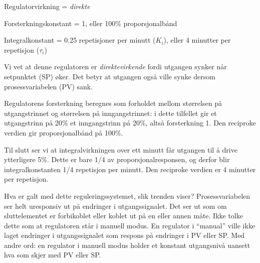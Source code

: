 
Regulatorvirkning = {\it direkte}

\vskip 10pt

Forsterkningskonstant = 1, eller 100\% proporsjonalbånd

\vskip 10pt

Integralkonstant = 0.25 repetisjoner per minutt ($K_i$), eller 4 minutter per repetisjon ($\tau_i$)







Vi vet at denne regulatoren er {\it direktevirkende} fordi utgangen synker når setpunktet (SP) øker. Det betyr at utgangen også ville synke dersom prosessvariabelen (PV) sank.

Regulatorens forsterkning beregnes som forholdet mellom størrelsen på utgangstrinnet og størrelsen på inngangstrinnet: i dette tilfellet gir et utgangstrinn på 20\% et inngangstrinn på 20\%, altså forsterkning 1. Den reciproke verdien gir proporsjonalbånd på 100\%.

Til slutt ser vi at integralvirkningen over ett minutt får utgangen til å drive ytterligere 5\%. Dette er bare 1/4 av proporsjonalresponsen, og derfor blir integralkonstanten 1/4 repetisjon per minutt. Den reciproke verdien er 4 minutter per repetisjon.
 
\vskip 10pt

Hva er galt med dette reguleringssystemet, slik trenden viser? Prosessvariabelen ser helt uresponsiv ut på endringer i utgangssignalet. Det ser ut som om sluttelementet er forbikoblet eller koblet ut på en eller annen måte. Ikke tolke dette som at regulatoren står i manuell modus. En regulator i ``manual'' ville ikke laget endringer i utgangssignalet som respons på endringer i PV eller SP. Med andre ord: en regulator i manuell modus holder et konstant utgangsnivå uansett hva som skjer med PV eller SP.


